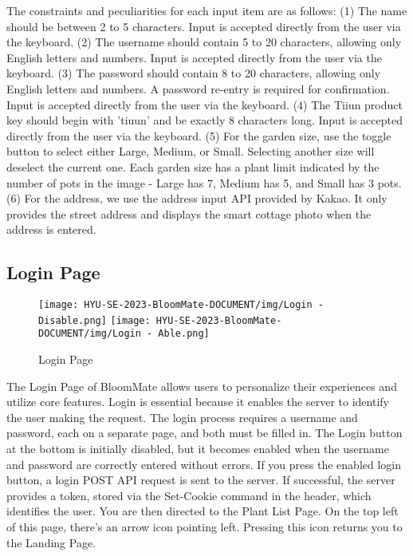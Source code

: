 \documentclass[conference, a4paper]{IEEEtran}
\begin{document}
The constraints and peculiarities for each input item are as follows: (1) The name should be between 2 to 5 characters. Input is accepted directly from the user via the keyboard. (2) The username should contain 5 to 20 characters, allowing only English letters and numbers. Input is accepted directly from the user via the keyboard. (3) The password should contain 8 to 20 characters, allowing only English letters and numbers. A password re-entry is required for confirmation. Input is accepted directly from the user via the keyboard. (4) The Tiiun product key should begin with 'tiuun' and be exactly 8 characters long. Input is accepted directly from the user via the keyboard. (5) For the garden size, use the toggle button to select either Large, Medium, or Small. Selecting another size will deselect the current one. Each garden size has a plant limit indicated by the number of pots in the image - Large has 7, Medium has 5, and Small has 3 pots. (6) For the address, we use the address input API provided by Kakao. It only provides the street address and displays the smart cottage photo when the address is entered.


\subsection{Login Page}
    \begin{figure}[h]
    \centerline{
        \texttt{[image: HYU-SE-2023-BloomMate-DOCUMENT/img/Login - Disable.png]}
        \texttt{[image: HYU-SE-2023-BloomMate-DOCUMENT/img/Login - Able.png]}
    }
    \label{fig}
    \caption{Login Page}
    \end{figure}
The Login Page of BloomMate allows users to personalize their experiences and utilize core features. Login is essential because it enables the server to identify the user making the request. The login process requires a username and password, each on a separate page, and both must be filled in. The Login button at the bottom is initially disabled, but it becomes enabled when the username and password are correctly entered without errors. If you press the enabled login button, a login POST API request is sent to the server. If successful, the server provides a token, stored via the Set-Cookie command in the header, which identifies the user. You are then directed to the Plant List Page. On the top left of this page, there's an arrow icon pointing left. Pressing this icon returns you to the Landing Page.
\end{document}
